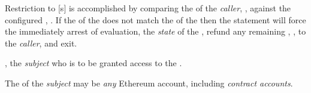 \begin{code}
\begin{modifiers}
      \begin{displayquote}
        Restriction to [s] is accomplished by comparing the
         of the  \emph{caller}, ,
        against the configured , . If the
         of the  does not match the
         of the  then the  statement
        will force the immediately arrest of  evaluation,
         the \emph{state} of the , refund any
        remaining , , to the \emph{caller}, and
        exit.\footnotemark{}

      \end{displayquote}


      \begin{parameters}
      \item {}, the \emph{subject} who is to be granted
        access to the .

        \begin{displayquote}
          The  of the \emph{subject} may be \emph{any} Ethereum
          account, including \emph{contract accounts}.
        \end{displayquote}
      \end{parameters}
  \end{modifiers}
\end{code}
